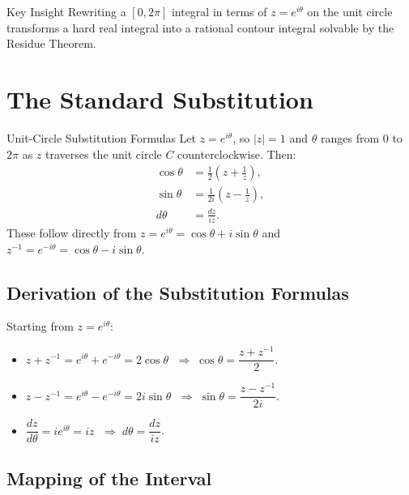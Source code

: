 \documentclass[12pt,a4paper]{article}
\begin{document}
\begin{learnbox}{Key Insight}
Rewriting a $[0,2\pi]$ integral in terms of $z = e^{i\theta}$ on the unit
circle transforms a hard real integral into a rational contour integral
solvable by the Residue Theorem.
\end{learnbox}

\section{The Standard Substitution}

\begin{infobox}{Unit-Circle Substitution Formulas}
Let $z = e^{i\theta}$, so $|z| = 1$ and $\theta$ ranges from $0$ to $2\pi$
as $z$ traverses the unit circle $C$ counterclockwise. Then:
\begin{align}
  \cos\theta &= \frac{1}{2}\left(z + \frac{1}{z}\right), \label{eq:cos}\\
  \sin\theta &= \frac{1}{2i}\left(z - \frac{1}{z}\right), \label{eq:sin}\\
  d\theta    &= \frac{dz}{iz}. \label{eq:dtheta}
\end{align}
These follow directly from $z = e^{i\theta} = \cos\theta + i\sin\theta$ and
$z^{-1} = e^{-i\theta} = \cos\theta - i\sin\theta$.
\end{infobox}

\subsection*{Derivation of the Substitution Formulas}

Starting from $z = e^{i\theta}$:
\begin{itemize}
  \item $z + z^{-1} = e^{i\theta} + e^{-i\theta} = 2\cos\theta$
        $\;\Rightarrow\; \cos\theta = \dfrac{z + z^{-1}}{2}$.
  \item $z - z^{-1} = e^{i\theta} - e^{-i\theta} = 2i\sin\theta$
        $\;\Rightarrow\; \sin\theta = \dfrac{z - z^{-1}}{2i}$.
  \item $\dfrac{dz}{d\theta} = ie^{i\theta} = iz$
        $\;\Rightarrow\; d\theta = \dfrac{dz}{iz}$.
\end{itemize}

\subsection*{Mapping of the Interval}
\end{document}
